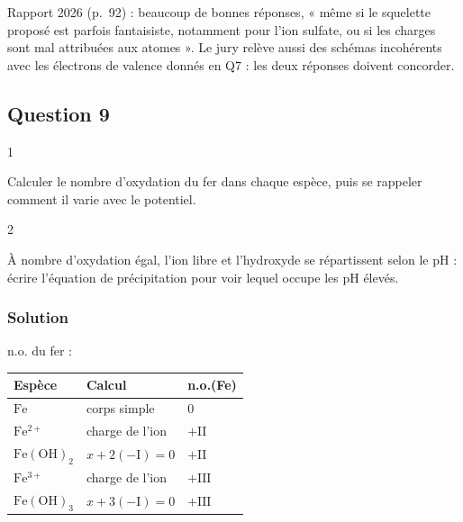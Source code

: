\documentclass[11pt,a4paper]{article}
\begin{document}
\begin{jury}

Rapport 2026 (p.~92) : beaucoup de bonnes réponses, « même si le squelette proposé est parfois fantaisiste, notamment pour l'ion sulfate, ou si les charges sont mal attribuées aux atomes ». Le jury relève aussi des schémas incohérents avec les électrons de valence donnés en Q7 : les deux réponses doivent concorder.

\end{jury}

\hypertarget{question-9}{%
\subsection{Question 9}\label{question-9}}

\begin{indication}{1}

Calculer le nombre d'oxydation du fer dans chaque espèce, puis se rappeler comment il varie avec le potentiel.

\end{indication}

\begin{indication}{2}

À nombre d'oxydation égal, l'ion libre et l'hydroxyde se répartissent selon le pH : écrire l'équation de précipitation pour voir lequel occupe les pH élevés.

\end{indication}

\hypertarget{solution-8}{%
\subsubsection{Solution}\label{solution-8}}

n.o. du fer :

\begin{longtable}[]{@{}lll@{}}
\toprule\noalign{}
Espèce & Calcul & n.o.(Fe) \\
\midrule\noalign{}
\endhead
\bottomrule\noalign{}
\endlastfoot
\(\mathrm{Fe}\) & corps simple & \(0\) \\
\(\mathrm{Fe^{2+}}\) & charge de l'ion & \(+\mathrm{II}\) \\
\(\mathrm{Fe(OH)_2}\) & \(x+2(-\mathrm I)=0\) & \(+\mathrm{II}\) \\
\(\mathrm{Fe^{3+}}\) & charge de l'ion & \(+\mathrm{III}\) \\
\(\mathrm{Fe(OH)_3}\) & \(x+3(-\mathrm I)=0\) & \(+\mathrm{III}\) \\
\end{longtable}
\end{document}
